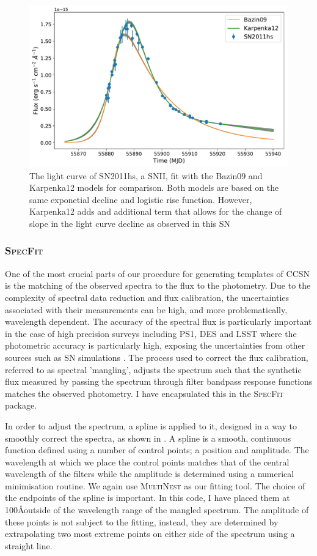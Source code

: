 \begin{figure}
  \centering
  \includegraphics[width=\textwidth]{Figures/Chapter4/CCModels}
  \caption{The light curve of SN2011hs, a SNII, fit with the Bazin09 and Karpenka12 models for comparison. Both models are based on the same exponetial decline and logistic rise function. However, Karpenka12 adds and additional term that allows for the change of slope in the light curve decline as observed in this SN}
  \label{fig:CCSNModelFits}
\end{figure}

\subsubsection{\textsc{SpecFit}}
One of the most crucial parts of our procedure for generating templates of CCSN is the matching of the observed spectra to the flux to the photometry. Due to the complexity of spectral data reduction and flux calibration, the uncertainties associated with their measurements can be high, and more problematically, wavelength dependent. The accuracy of the spectral flux is particularly important in the case of high precision surveys including PS1, DES and LSST where the photometric accuracy is particularly high, exposing the uncertainties from other sources such as SN simulations \citep{Jones2016}. The process used to correct the flux calibration, referred to as spectral 'mangling', adjusts the spectrum such that the synthetic flux measured by passing the spectrum through filter bandpass response functions matches the observed photometry. I have encapsulated this in the \textsc{SpecFit} package.

In order to adjust the spectrum, a spline is applied to it, designed in a way to smoothly correct the spectra, as shown in . A spline is a smooth, continuous function defined using a number of control points; a position and amplitude. The wavelength at which we place the control points matches that of the central wavelength of the filters while the amplitude is determined using a numerical minimisation routine. We again use \textsc{MultiNest} as our fitting tool. The choice of the endpoints of the spline is important. In this code, I have placed them at 100\AA outside of the wavelength range of the mangled spectrum. The amplitude of these points is not subject to the fitting, instead, they are determined by extrapolating two most extreme points on either side of the spectrum using a straight line.

